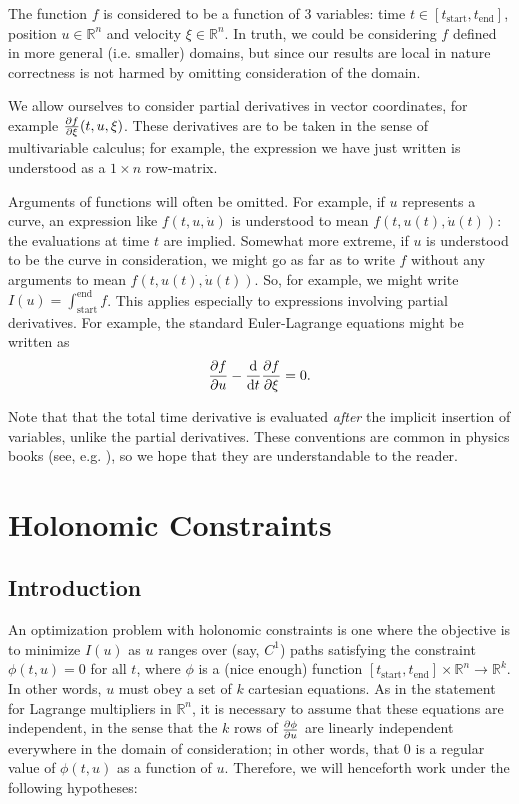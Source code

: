 \documentclass{article}
\theoremstyle{plain}
\theoremstyle{nonumberplain}
\newcommand{\R}{\mathbb{R}}
\newcommand{\tstart}{\mathrm{start}}
\newcommand{\tend}{\mathrm{end}}
\begin{document}
The function $f$ is considered to be a function of 3 variables: time $t \in [t_\tstart, t_\tend]$, position $u \in \R^n$ and velocity $\xi \in \R^n$. In truth, we could be considering $f$ defined in more general (i.e. smaller) domains, but since our results are local in nature correctness is not harmed by omitting consideration of the domain.

We allow ourselves to consider partial derivatives in vector coordinates, for example $\diffp f \xi (t, u, \xi)$. These derivatives are to be taken in the sense of multivariable calculus; for example, the expression we have just written is understood as a $1 \times n$ row-matrix.

Arguments of functions will often be omitted. For example, if $u$ represents a curve, an expression like $f(t,u,\dot u)$ is understood to mean $f(t,u(t),\dot u(t))$: the evaluations at time $t$ are implied. Somewhat more extreme, if $u$ is understood to be the curve in consideration, we might go as far as to write $f$ without any arguments to mean $f(t,u(t),\dot u(t))$. So, for example, we might write $I(u) = \int_\tstart^\tend f$. This applies especially to expressions involving partial derivatives. For example, the standard Euler-Lagrange equations might be written as
\[\diffp f u - \diff*{\diffp f \xi}t = 0.\]

Note that that the total time derivative is evaluated \emph{after} the implicit insertion of variables, unlike the partial derivatives. These conventions are common in physics books (see, e.g. \cite{goldstein}), so we hope that they are understandable to the reader.


\section{Holonomic Constraints}

\subsection{Introduction}

An optimization problem with holonomic constraints is one where the objective is to minimize $I(u)$ as $u$ ranges over (say, $C^1$) paths satisfying the constraint $\phi(t, u) = 0$ for all $t$, where $\phi$ is a (nice enough) function $[t_\tstart, t_\tend] \times \R^n \to \R^k$. In other words, $u$ must obey a set of $k$ cartesian equations. As in the statement for Lagrange multipliers in $\R^n$, it is necessary to assume that these equations are independent, in the sense that the $k$ rows of $\diffp \phi u$ are linearly independent everywhere in the domain of consideration; in other words, that 0 is a regular value of $\phi(t, u)$ as a function of $u$. Therefore, we will henceforth work under the following hypotheses:
\end{document}
